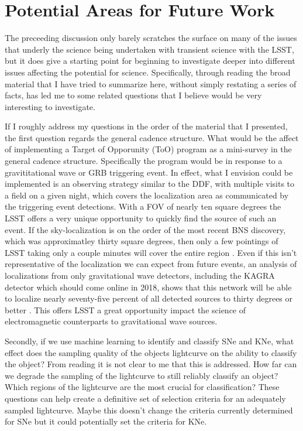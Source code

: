 \documentclass[12pt]{article}
\begin{document}
\section{Potential Areas for Future Work} %
The preceeding discussion only barely scratches the surface on many of the issues that underly the science being undertaken with transient science with the LSST, but it does give a starting point for beginning to investigate deeper into different issues affecting the potential for science. Specifically, through reading the broad material that I have tried to summarize here, without simply restating a series of facts, has led me to some related questions that I believe would be very interesting to investigate. \par
If I roughly address my questions in the order of the material that I presented, the first question regards the general cadence structure. What would be the affect of implementing a Target of Opporunity (ToO) program as a mini-survey in the general cadence structure. Specifically the program would be in response to a gravititational wave or GRB triggering event. In effect, what I envision could be implemented is an observing strategy similar to the DDF, with multiple visits to a field on a given night, which covers the localization area as communicated by the triggering event detections. With a FOV of nearly ten square degrees the LSST offers a very unique opportunity to quickly find the source of such an event. If the sky-localization is on the order of the most recent BNS discovery, which was approximatley thirty square degrees, then only a few pointings of LSST taking only a couple minutes will cover the entire region \citep{Kasliwal2017}. Even if this isn't representative of the localization we can expect from future events, an analysis of localizations from only gravitational wave detectors, including the KAGRA detector which should come online in 2018, shows that this network will be able to localize nearly seventy-five percent of all detected sources to thirty degrees or better \citep{Fairhurst2014}. This offers LSST a great opportunity impact the science of electromagnetic counterparts to gravitational wave sources.\par
Secondly, if we use machine learning to identify and classify SNe and KNe, what effect does the sampling quality of the objects lightcurve on the ability to classify the object? From reading \cite{Lochner2016} it is not clear to me that this is addressed. How far can we degrade the sampling of the lightcurve to still reliably classify an object? Which regions of the lightcurve are the most crucial for classification? These questions can help create a definitive set of selection criteria for an adequately sampled lightcurve. Maybe this doesn't change the criteria currently determined for SNe but it could potentially set the criteria for KNe.\par
\end{document}
